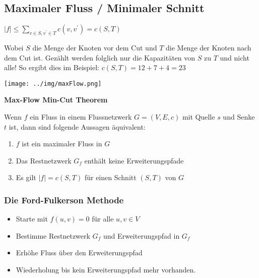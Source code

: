 \documentclass[german]{latex4ei/latex4ei_sheet}
\begin{document}
\begin{sectionbox}
\subsection{Maximaler Fluss / Minimaler Schnitt}\smallskip
\begin{emphbox}
$|f| \leq \sum\limits_{v \in S, v^{\prime} \in T} c\left(v, v^{\prime}\right)=c(S, T)$
\end{emphbox}
Wobei $S$ die Menge der Knoten vor dem Cut und $T$ die Menge der Knoten nach dem Cut ist. Gezählt werden folglich nur die Kapazitäten von $S$ zu $T$ und nicht alle! So ergibt dies im Beispiel: $c(S,T)=12+7+4=23$\par\smallskip

\begin{center}
    \texttt{[image: ../img/maxFlow.png]}
\end{center}\par\smallskip

\begin{greenbox}
\textbf{Max-Flow Min-Cut Theorem}\par
Wenn $f$ ein Fluss in einem Flussnetzwerk $G=(V, E, c)$ mit Quelle $s$ und Senke $t$ ist, dann sind folgende Aussagen äquivalent:
\begin{enumerate}
    \item $f$ ist ein maximaler Fluss in $G$
    \item Das Restnetzwerk $G_{f}$ enthält keine Erweiterungspfade
    \item Es gilt $|f|=c(S, T)$ für einen Schnitt $(S, T)$ von $G$
\end{enumerate}
\end{greenbox}\vspace{10px}

\subsubsection{Die Ford-Fulkerson Methode}\smallskip
\begin{itemize}
    \item Starte mit $f(u, v)=0$ für alle $u, v \in V$
    \item Bestimme Restnetzwerk $G_{f}$ und Erweiterungspfad in $G_{f}$
    \item Erhöhe Fluss über den Erweiterungspfad
    \item Wiederholung bis kein Erweiterungspfad mehr vorhanden.
\end{itemize}\smallskip


\end{sectionbox}
\end{document}
